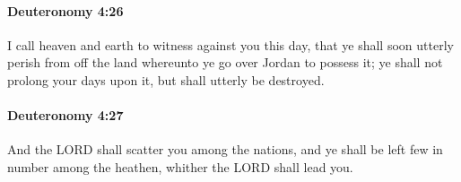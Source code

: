		\paragraph{Deuteronomy 4:26} %
			\label{DEUTERONOMY-4-26}

			I call heaven and earth to witness against you this day, that ye shall soon utterly perish from off the land whereunto ye go over Jordan to possess it; ye shall not prolong your days upon it, but shall utterly be destroyed.


		\paragraph{Deuteronomy 4:27} %
			\label{DEUTERONOMY-4-27}

			And the LORD shall scatter you among the nations, and ye shall be left few in number among the heathen, whither the LORD shall lead you.

